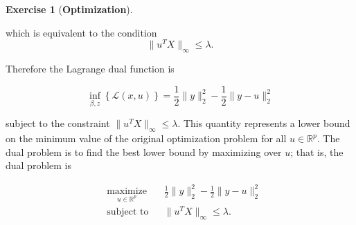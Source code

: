 \documentclass{article}
\theoremstyle{definition}
\newtheorem{exercise}{Exercise}
\theoremstyle{definition}
\theoremstyle{definition}
\theoremstyle{definition}
\theoremstyle{definition}
\begin{document}
\begin{exercise}[\textbf{Optimization}]
\begin{enumerate}[(a)]
which is equivalent to the condition
\[
\lVert u^TX \rVert_\infty \leq \lambda.
\]

Therefore the Lagrange dual function is


 

%
%
% 

\begin{equation}\label{2018.screen.5.a.dual}
 \inf_{\beta, z} \left\{ \mathcal{L}(x, u)\right\}  = \frac{1}{2} \lVert y \rVert_2^2 - \frac{1}{2} \lVert y - u \rVert_2^2 
\end{equation}

subject to the constraint \(\lVert u^TX \rVert_\infty \leq \lambda\). This quantity represents a lower bound on the minimum value of the original optimization problem for all \(u \in \mathbb{R}^p\). The dual problem is to find the best lower bound by maximizing over \(u\); that is, the dual problem is

\begin{equation}\label{2018.screen.5.a.dual.ans}
\begin{aligned}
& \underset{u \in \mathbb{R}^p}{\text{maximize}}
& & \frac{1}{2} \lVert y \rVert_2^2 - \frac{1}{2} \lVert y - u \rVert_2^2  \\
& \text{subject to}
& & \lVert u^TX \rVert_\infty \leq \lambda.
\end{aligned}
\end{equation}


\end{enumerate}
\end{exercise}
\end{document}
